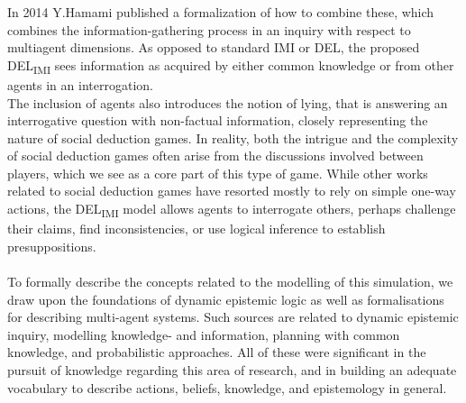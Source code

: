 In 2014 Y.Hamami\cite{delimi} published a formalization of how to combine
these, which combines the information-gathering process in an inquiry with
respect to multiagent dimensions. As opposed to standard IMI or DEL, the
proposed DEL\textsubscript{IMI} sees information as acquired by either common
knowledge or from other agents in an interrogation. \\ The inclusion of agents
also introduces the notion of lying, that is answering an interrogative
question with non-factual information, closely representing the nature of
social deduction games. In reality, both the intrigue and the complexity of
social deduction games often arise from the discussions involved between
players, which we see as a core part of this type of game. While other works
related to social deduction games have resorted mostly to rely on simple
one-way actions, the DEL\textsubscript{IMI} model allows agents to interrogate
others, perhaps challenge their claims, find inconsistencies, or use logical
inference to establish presuppositions.\\ \\ To formally describe the concepts
related to the modelling of this simulation, we draw upon the foundations of
dynamic epistemic logic as well as formalisations for describing multi-agent
systems. Such sources are related to dynamic epistemic inquiry\cite{delimi},
modelling knowledge- and
information\cite{modelling_multi_agent_epistemic_systems}, planning with common
knowledge\cite{multi_agent_epistemic_planner_common_knowledge}, and
probabilistic approaches\cite{probibalistic_multiagent_systems}. All of these
were significant in the pursuit of knowledge regarding this area of research,
and in building an adequate vocabulary to describe actions, beliefs, knowledge,
and epistemology in general.